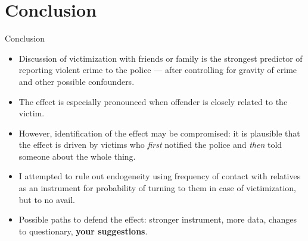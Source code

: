 \documentclass{beamer}
\begin{document}
\section{Conclusion}
\begin{frame}{Conclusion}
\begin{itemize}
	\item Discussion of victimization with friends or family is the strongest predictor of reporting violent crime to the police --- after controlling for gravity of crime and other possible confounders.
	\item The effect is especially pronounced when offender is closely related to the victim.
	\item However, identification of the effect may be compromised: it is plausible that the effect is driven by victims who \textit{first} notified the police and \textit{then} told someone about the whole thing.
	\item I attempted to rule out endogeneity using frequency of contact with relatives as an instrument for probability of turning to them in case of victimization, but to no avail.
	\item Possible paths to defend the effect: stronger instrument, more data, changes to questionary, \textbf{your suggestions}. 
\end{itemize}
\end{frame}
\end{document}
